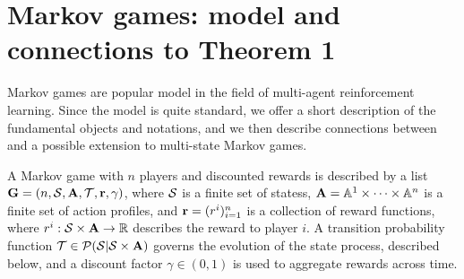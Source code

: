 \section{Markov games: model and connections to Theorem 1}  \label{appendix:markov-games}

Markov games are popular model in the field of multi-agent reinforcement learning. Since the model is quite standard, we offer a short description of the fundamental objects and notations, and we then describe connections between  and a possible extension to multi-state Markov games. 






A Markov game with $n$ players and discounted rewards is described by a list ${\mathbf{G}} = (n, \mathcal{S}, {\mathbf{A}}, \mathcal{T} , {\mathbf{r}}, \gamma )$, where $\mathcal{S}$ is a finite set of statess, ${\mathbf{A}} = \mathbb{A}^1 \times \cdots \times \mathbb{A}^n$ is a finite set of action profiles, and ${\mathbf{r}} = ( r^i )_{i=1}^n$ is a collection of reward functions, where $r^i : \mathcal{S} \times {\mathbf{A}} \to \mathbb{R}$ describes the reward to player $i$. A transition probability function $\mathcal{T} \in \mathcal{P} ( \mathcal{S} | \mathcal{S} \times {\mathbf{A}} )$ governs the evolution of the state process, described below, and a discount factor $\gamma \in (0,1)$ is used to aggregate rewards across time. 


